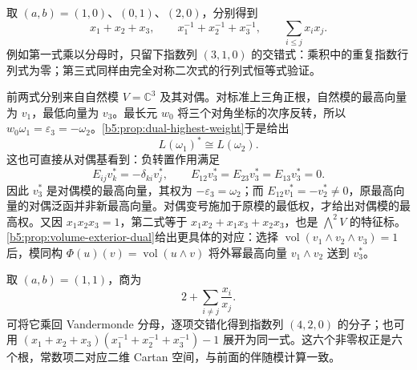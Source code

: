 \ProseParagraphBreak

取 \((a,b)=(1,0)\)、\((0,1)\)、\((2,0)\)，分别得到
\[
	x_1+x_2+x_3,\qquad x_1^{-1}+x_2^{-1}+x_3^{-1},\qquad \sum_{i\le j}x_ix_j.
\]
例如第一式乘以分母时，只留下指数列 \((3,1,0)\) 的交错式：乘积中的重复指数行列式为零；第三式同样由完全对称二次式的行列式恒等式验证。

\ProseParagraphBreak

前两式分别来自自然模 \(V=\mathbb C^3\) 及其对偶。对标准上三角正根，自然模的最高向量为 \(v_1\)，最低向量为 \(v_3\)。最长元 \(w_0\) 将三个对角坐标的次序反转，所以 \(w_0\omega_1=\varepsilon_3=-\omega_2\)。\cref{b5:prop:dual-highest-weight}于是给出
\[
	L(\omega_1)^*\cong L(\omega_2).
\]
这也可直接从对偶基看到：负转置作用满足
\[
	E_{ij}v_k^*=-\delta_{ki}v_j^*,\qquad E_{12}v_3^*=E_{23}v_3^*=E_{13}v_3^*=0.
\]
因此 \(v_3^*\) 是对偶模的最高向量，其权为 \(-\varepsilon_3=\omega_2\)；而 \(E_{12}v_1^*=-v_2^*\ne0\)，原最高向量的对偶泛函并非新最高向量。对偶变号施加于原模的最低权，才给出对偶模的最高权。又因 \(x_1x_2x_3=1\)，第二式等于 \(x_1x_2+x_1x_3+x_2x_3\)，也是 \(\bigwedge^2V\) 的特征标。\cref{b5:prop:volume-exterior-dual}给出更具体的对应：选择 \(\operatorname{vol}(v_1\wedge v_2\wedge v_3)=1\) 后，模同构 \(\Phi(u)(v)=\operatorname{vol}(u\wedge v)\) 将外幂最高向量 \(v_1\wedge v_2\) 送到 \(v_3^*\)。

\ProseParagraphBreak

取 \((a,b)=(1,1)\)，商为
\[
	2+\sum_{i\ne j}\frac{x_i}{x_j}.
\]
可将它乘回 Vandermonde 分母，逐项交错化得到指数列 \((4,2,0)\) 的分子；也可用 \((x_1+x_2+x_3)(x_1^{-1}+x_2^{-1}+x_3^{-1})-1\) 展开为同一式。这六个非零权正是六个根，常数项二对应二维 Cartan 空间，与前面的伴随模计算一致。
